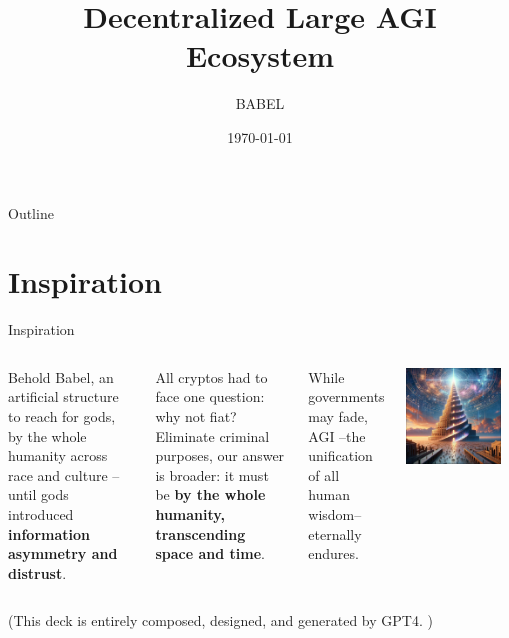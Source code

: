 \documentclass{beamer}
\title{Decentralized Large AGI Ecosystem}
\author{BABEL}
\institute{P.I.V.O.T. DAO}
\date{\today}
\begin{document}
\begin{frame}
\titlepage
\end{frame}

\begin{frame}{Outline}
\tableofcontents
\end{frame}

\section{Inspiration}
\begin{frame}{Inspiration}

\begin{columns}
Behold Babel, an artificial structure to reach for gods,  by the whole humanity across race and culture -- until gods introduced \textbf{information asymmetry and distrust}. 

All cryptos had to face one question: why not fiat? Eliminate criminal purposes, our answer is broader: it must be \textbf{by the whole humanity, transcending space and time}. 

While governments may fade, AGI --the unification of all human wisdom-- eternally endures.
\begin{center}
\includegraphics[width=0.9\textwidth]{images/babel.png}
\end{center}
\end{columns}


\begin{center}
(This deck is entirely composed, designed, and generated by GPT4. )
\end{center}
\end{frame}
\end{document}

